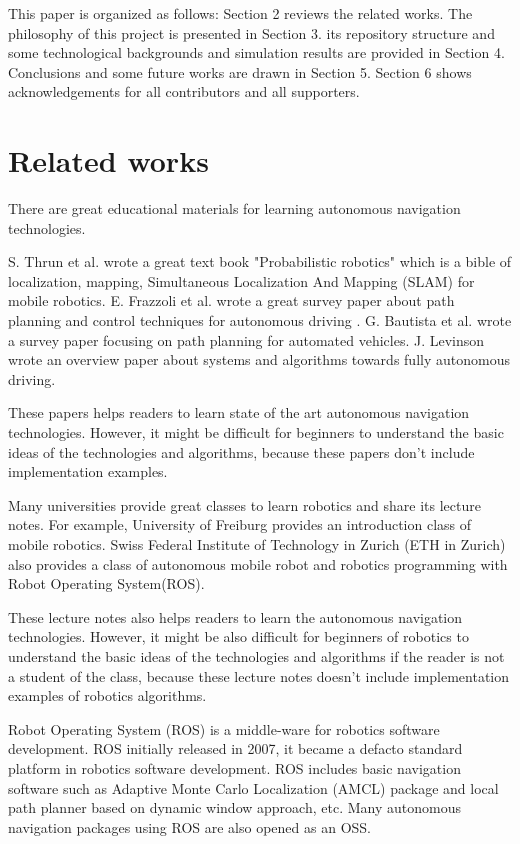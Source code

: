 \documentclass{bmvc2k}
\begin{document}
This paper is organized as follows: Section 2 reviews the related works. The philosophy of this project is presented in Section 3. its repository structure and some technological backgrounds and simulation results are provided in Section 4. Conclusions and some future works are drawn in Section 5. 
Section 6 shows acknowledgements for all contributors and all supporters. 


\section{Related works}

There are great educational materials for learning autonomous navigation technologies.

S. Thrun et al. wrote a great text book "Probabilistic robotics" which is a bible of localization, mapping, Simultaneous Localization And Mapping (SLAM) for mobile robotics\cite{PR}.
E. Frazzoli et al. wrote a great survey paper about path planning and control techniques for autonomous driving \cite{pathtracking}.
G. Bautista et al. wrote a survey paper focusing on path planning for automated vehicles\cite{pathplanning}.
J. Levinson wrote an overview paper about systems and algorithms towards fully autonomous driving\cite{Levinson2011}.

These papers helps readers to learn state of the art autonomous navigation technologies.
However, it might be difficult for beginners to understand the basic ideas of the technologies and algorithms, because these papers don't include implementation examples.

Many universities provide great classes to learn robotics and share its lecture notes.
For example, University of Freiburg provides an introduction class of mobile robotics\cite{course1}.
Swiss Federal Institute of Technology in Zurich (ETH in Zurich) also provides a class of autonomous mobile robot\cite{course2} and robotics programming with Robot Operating System(ROS)\cite{course3}.

These lecture notes also helps readers to learn the autonomous navigation technologies.
However, it might be also difficult for beginners of robotics to understand the basic ideas of the technologies and algorithms if the reader is not a student of the class, because these lecture notes doesn't include implementation examples of robotics algorithms.

Robot Operating System (ROS) is a middle-ware for robotics software development\cite{ros}\cite{rospaper}.
ROS initially released in 2007, it became a defacto standard platform in robotics software development.
ROS includes basic navigation software such as Adaptive Monte Carlo Localization (AMCL) package and local path planner based on dynamic window approach, etc\cite{rosnavigation}.
Many autonomous navigation packages using ROS are also opened as an OSS.
\end{document}
